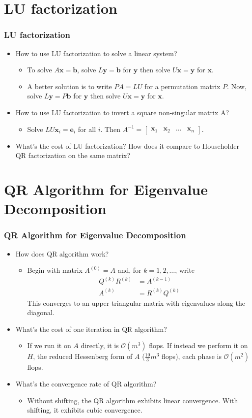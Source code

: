 \documentclass[10pt]{beamer}
\renewcommand{\vec}[1]{\boldsymbol{#1}}
\newcommand{\bigO}[1]{\mathcal{O}\left(#1\right)}
\newcommand{\subitem}[1]{\begin{itemize}\item #1\end{itemize}}
\begin{document}
\section{LU factorization}
\begin{frame}
    \frametitle{LU factorization}
    \begin{itemize}[<+->]
      \item How to use LU factorization to solve a linear system?
      \subitem{To solve \(A\vec{x} = \vec{b}\), solve \(L\vec{y} = \vec{b}\) for \(\vec{y}\) then solve \(U\vec{x} = \vec{y}\) for \(\vec{x}\).}
      \subitem{A better solution is to write \(PA = LU\) for a permutation matrix \(P\). Now, solve \(L\vec{y} = P\vec{b}\) for \(\vec{y}\) then solve \(U\vec{x} = \vec{y}\) for \(\vec{x}\).}
      \item How to use LU factorization to invert a square non-singular matrix A?
    \subitem{Solve \(LU\vec{x}_i=\vec{e}_i\) for all \(i\). Then \(A^{-1}=\begin{bmatrix}\vec{x}_1 & \vec{x}_2 & \hdots & \vec{x}_n\end{bmatrix}\).}
      \item What’s the cost of LU factorization? How does it compare to Householder QR factorization on the same matrix?
    \end{itemize}
  \end{frame}

\section{QR Algorithm for Eigenvalue Decomposition}
\begin{frame}
  \frametitle{QR Algorithm for Eigenvalue Decomposition}
  \begin{itemize}[<+->]
    \item How does QR algorithm work?
  \subitem{Begin with matrix \(A^{(0)} = A\) and, for \(k = 1, 2, \hdots\), write \begin{align*}Q^{(k)}R^{(k)} &= A^{(k-1)}\\A^{(k)} &= R^{(k)}Q^{(k)}\end{align*} This converges to an upper triangular matrix with eigenvalues along the diagonal.}
    \item What’s the cost of one iteration in QR algorithm?
    \subitem{If we run it on \(A\) directly, it is \(\bigO{m^3}\) flops. If instead we perform it on \(H\), the reduced Hessenberg form of \(A\) (\(\frac{10}{3}m^3\) flops), each phase is \(\bigO{m^2}\) flops.}
    \item What’s the convergence rate of QR algorithm?
    \subitem{Without shifting, the QR algorithm exhibits linear convergence. With shifting, it exhibits cubic convergence.}
  \end{itemize}
\end{frame}
\end{document}

